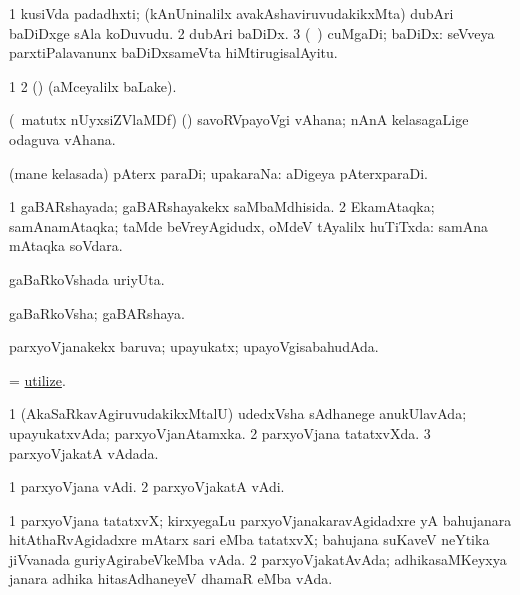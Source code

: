 \bentry
{} 
\gl{\nA}
\bmng
\bnum
\num{1} kusiVda padadhxti; (kAnUninalilx avakAshaviruvudakikxMta) dubAri baDiDxge sAla koDuvudu. 
\num{2} dubAri baDiDx. 
\num{3} (\sA\ \rUpa) cuMgaDi; baDiDx:  seVveya parxtiPalavanunx baDiDxsameVta hiMtirugisalAyitu. 
\enum
\emng
\eentry


\bentry
{}
\gl{\saMkiSx}
\expl{}
\bmng
\bnum
\num{1}  
\num{2} (\ame)  (aMceyalilx baLake). 
\enum
\emng
\eentry

\bentry
{} 
\gl{\nA}
\expl{}
\bmng
(\AseTxrXV\ matutx nUyxsiZVlaMDf) (\ashi) savoRVpayoVgi vAhana; nAnA kelasagaLige odaguva vAhana. 
\emng
\eentry

\bentry
{} 
\gl{\nA}
\expl{}
\bmng
(mane kelasada) pAterx paraDi; upakaraNa:  aDigeya pAterxparaDi. 
\emng
\eentry

\bentry
{} 
\gl{\gu}
\expl{}
\bmng
\bnum
\num{1} gaBARshayada; gaBARshayakekx saMbaMdhisida. 
\num{2} EkamAtaqka; samAnamAtaqka; taMde beVreyAgidudx, oMdeV tAyalilx huTiTxda:  samAna mAtaqka soVdara. 
\enum
\emng
\eentry

\bentry
{} 
\gl{\nA}
\expl{}
\bmng
gaBaRkoVshada uriyUta. 
\emng
\eentry

\bentry
{} 
\gl{\nA}
\bmng
gaBaRkoVsha; gaBARshaya. 
\emng
\eentry

\bentry
{} 
\gl{\gu}
\bmng
parxyoVjanakekx baruva; upayukatx; upayoVgisabahudAda. 
\emng
\eentry

\bentry
{} 
\gl{\sakirx}
\expl{}
\bmng
= \hyperlink{utilize}{utilize}. 
\emng
\eentry

\bentry
{} 
\gl{\gu}
\expl{}
\bmng
\bnum
\num{1} (AkaSaRkavAgiruvudakikxMtalU) udedxVsha sAdhanege anukUlavAda; upayukatxvAda; parxyoVjanAtamxka. 
\num{2} parxyoVjana tatatxvXda. 
\num{3} parxyoVjakatA vAdada. 
\enum
\emng
\eentry

\bentry
{} 
\gl{\nA}
\expl{}
\bmng
\bnum
\num{1} parxyoVjana vAdi. 
\num{2} parxyoVjakatA vAdi. 
\enum
\emng
\eentry

\bentry
{} 
\gl{\nA}
\expl{}
\bmng
\bnum
\num{1} parxyoVjana tatatxvX; kirxyegaLu parxyoVjanakaravAgidadxre yA bahujanara hitAthaRvAgidadxre mAtarx sari eMba tatatxvX; bahujana suKaveV neYtika jiVvanada guriyAgirabeVkeMba vAda. 
\num{2} parxyoVjakatAvAda; adhikasaMKeyxya janara adhika hitasAdhaneyeV dhamaR eMba vAda. 
\enum
\emng
\eentry

